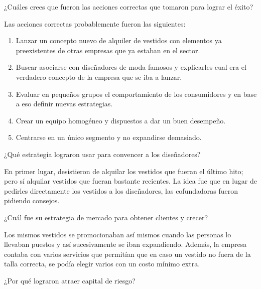




\begin{problema}
	¿Cuáles crees que fueron las acciones correctas que tomaron para lograr el éxito?
\end{problema}
\begin{sol}
	Las acciones correctas probablemente fueron las siguientes: \begin{enumerate}
		\item Lanzar un concepto nuevo de alquiler de vestidos con elementos ya preexistentes de otras empresas que ya estaban en el sector. 
		\item Buscar asociarse con diseñadores de moda famosos y explicarles cual era el verdadero concepto de la empresa que se iba a lanzar. 
		\item Evaluar en pequeños grupos el comportamiento de los consumidores y en base a eso definir nuevas estrategias. 
		\item Crear un equipo homogéneo y dispuestos a dar un buen desempeño. 
		\item Centrarse en un único segmento y no expandirse demasiado. 
	\end{enumerate}
\end{sol}
\begin{problema}
	¿Qué estrategia lograron usar para convencer a los diseñadores?
\end{problema}
\begin{sol}
	En primer lugar, desistieron de alquilar los vestidos que fueran el último hito; pero sí alquilar vestidos que fueran bastante recientes. La idea fue que en lugar de pedirles directamente los vestidos a los diseñadores, las cofundadoras fueron pidiendo consejos. 
\end{sol}
\begin{problema}
	¿Cuál fue su estrategia de mercado para obtener clientes y crecer?
\end{problema}
\begin{sol}
	Los mismos vestidos se promocionaban así mismos cuando las personas lo llevaban puestos y así sucesivamente se iban expandiendo. Además, la empresa contaba con varios servicios que permitían que en caso un vestido no fuera de la talla correcta, se podía elegir varios con un costo mínimo extra. 
\end{sol}
\begin{problema}
	¿Por qué lograron atraer capital de riesgo?
\end{problema}
